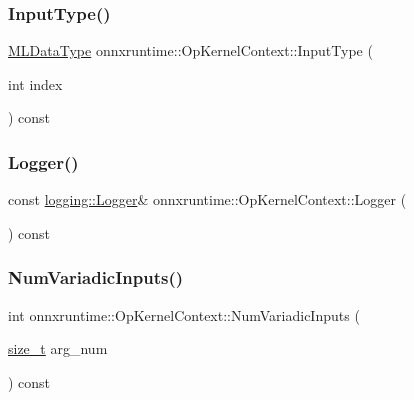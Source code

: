 \subsubsection{\texorpdfstring{Input\+Type()}{InputType()}}
{\footnotesize\ttfamily \mbox{\hyperlink{namespaceonnxruntime_ad77d0a6e838ec7da5dc35fed5ee66b49}{M\+L\+Data\+Type}} onnxruntime\+::\+Op\+Kernel\+Context\+::\+Input\+Type (\begin{DoxyParamCaption}\item[{int}]{index }\end{DoxyParamCaption}) const}

\mbox{\label{classonnxruntime_1_1OpKernelContext_a510003379f7b247e102390cc1deb5c7c}} 
\subsubsection{\texorpdfstring{Logger()}{Logger()}}
{\footnotesize\ttfamily const \mbox{\hyperlink{classonnxruntime_1_1logging_1_1Logger}{logging\+::\+Logger}}\& onnxruntime\+::\+Op\+Kernel\+Context\+::\+Logger (\begin{DoxyParamCaption}{ }\end{DoxyParamCaption}) const\hspace{0.3cm}{\ttfamily [inline]}}

\mbox{\label{classonnxruntime_1_1OpKernelContext_a961585972b6d85e8500faf2e138d3aaa}} 
\subsubsection{\texorpdfstring{Num\+Variadic\+Inputs()}{NumVariadicInputs()}}
{\footnotesize\ttfamily int onnxruntime\+::\+Op\+Kernel\+Context\+::\+Num\+Variadic\+Inputs (\begin{DoxyParamCaption}\item[{\mbox{\hyperlink{mlasi_8h_a503efbc1c6e50825320ad909366b78ab}{size\+\_\+t}}}]{arg\+\_\+num }\end{DoxyParamCaption}) const}

